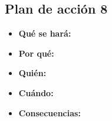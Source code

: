 \subsection{Plan de acción 8}

\begin{itemize}
	\item \textbf{Qué se hará: }
	\item \textbf{Por qué: }
	\item \textbf{Quién: }
	\item \textbf{Cuándo: }
	\item \textbf{Consecuencias: }
\end{itemize}



%
%

       
